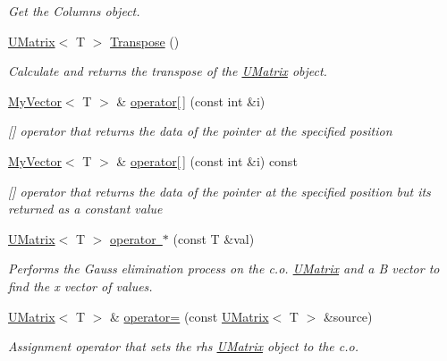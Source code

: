 \begin{DoxyCompactItemize}
\begin{DoxyCompactList}\small\item\em Get the Columns object. \end{DoxyCompactList}\item 
\mbox{\hyperlink{class_u_matrix}{U\+Matrix}}$<$ T $>$ \mbox{\hyperlink{class_u_matrix_a0aa03e248a41c8b1535d93bc67b4e4f1}{Transpose}} ()
\begin{DoxyCompactList}\small\item\em Calculate and returns the transpose of the \mbox{\hyperlink{class_u_matrix}{U\+Matrix}} object. \end{DoxyCompactList}\item 
\mbox{\hyperlink{class_my_vector}{My\+Vector}}$<$ T $>$ \& \mbox{\hyperlink{class_u_matrix_a0dea1e82fbf5ae67bec479c070b185dc}{operator\mbox{[}$\,$\mbox{]}}} (const int \&i)
\begin{DoxyCompactList}\small\item\em \mbox{[}\mbox{]} operator that returns the data of the pointer at the specified position \end{DoxyCompactList}\item 
\mbox{\hyperlink{class_my_vector}{My\+Vector}}$<$ T $>$ \& \mbox{\hyperlink{class_u_matrix_ab0ad5eda96c9a8bb9ca8c69d4bb8d5f8}{operator\mbox{[}$\,$\mbox{]}}} (const int \&i) const
\begin{DoxyCompactList}\small\item\em \mbox{[}\mbox{]} operator that returns the data of the pointer at the specified position but its returned as a constant value \end{DoxyCompactList}\item 
\mbox{\hyperlink{class_u_matrix}{U\+Matrix}}$<$ T $>$ \mbox{\hyperlink{class_u_matrix_ac5ccad89b228c8e264c4c5638098cbb7}{operator $\ast$}} (const T \&val)
\begin{DoxyCompactList}\small\item\em Performs the Gauss elimination process on the c.\+o. \mbox{\hyperlink{class_u_matrix}{U\+Matrix}} and a B vector to find the x vector of values. \end{DoxyCompactList}\item 
\mbox{\hyperlink{class_u_matrix}{U\+Matrix}}$<$ T $>$ \& \mbox{\hyperlink{class_u_matrix_a3f12f4544a460dd93dac8a883654310f}{operator=}} (const \mbox{\hyperlink{class_u_matrix}{U\+Matrix}}$<$ T $>$ \&source)
\begin{DoxyCompactList}\small\item\em Assignment operator that sets the rhs \mbox{\hyperlink{class_u_matrix}{U\+Matrix}} object to the c.\+o. \end{DoxyCompactList}\item 

\end{DoxyCompactItemize}
